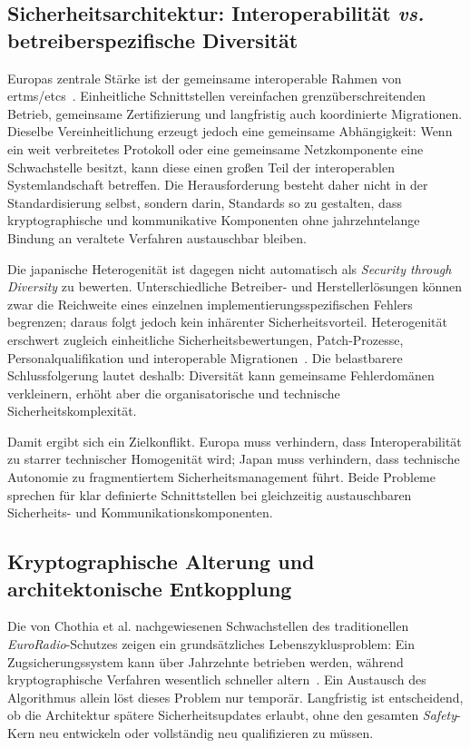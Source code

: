 \documentclass[runningheads]{res/llncs}
\begin{document}
\subsection{Sicherheitsarchitektur: Interoperabilität \textit{vs.} betreiberspezifische Diversität}
\label{sec:Sicherheitsarchitektur_Interoperabilität_vs_Betreiberspezifische_Diversität}
Europas zentrale Stärke ist der gemeinsame interoperable Rahmen von \gls{ertms}/\linebreak \gls{etcs}~\parencite[S. 49]{trinckaufETCS2024}. Einheitliche Schnittstellen vereinfachen grenzüberschreitenden Betrieb, gemeinsame Zertifizierung und langfristig auch koordinierte Migrationen. Dieselbe Vereinheitlichung erzeugt jedoch eine gemeinsame Abhängigkeit: Wenn ein weit verbreitetes Protokoll oder eine gemeinsame Netzkomponente eine Schwachstelle besitzt, kann diese einen großen Teil der interoperablen Systemlandschaft betreffen. Die Herausforderung besteht daher nicht in der Standardisierung selbst, sondern darin, Standards so zu gestalten, dass kryptographische und kommunikative Komponenten ohne jahrzehntelange Bindung an veraltete Verfahren austauschbar bleiben.

Die japanische Heterogenität ist dagegen nicht automatisch als \textit{Security through Diversity} zu bewerten. Unterschiedliche Betreiber- und Herstellerlösungen können zwar die Reichweite eines einzelnen implementierungsspezifischen Fehlers begrenzen; daraus folgt jedoch kein inhärenter Sicherheitsvorteil. Heterogenität erschwert zugleich einheitliche Sicherheitsbewertungen, Patch-Prozesse, Personalqualifikation und interoperable Migrationen~\parencite{yanaseJapanese2011}. Die belastbarere Schlussfolgerung lautet deshalb: Diversität kann gemeinsame Fehlerdomänen verkleinern, erhöht aber die organisatorische und technische Sicherheitskomplexität.

Damit ergibt sich ein Zielkonflikt. Europa muss verhindern, dass Interoperabilität zu starrer technischer Homogenität wird; Japan muss verhindern, dass technische Autonomie zu fragmentiertem Sicherheitsmanagement führt. Beide Probleme sprechen für klar definierte Schnittstellen bei gleichzeitig austauschbaren Sicherheits- und Kommunikationskomponenten.

\subsection{Kryptographische Alterung und architektonische Entkopplung}
\label{sec:Kryptographische_Schwachstellen_und_MILS-basierte_Architekturkapselung}
Die von Chothia et al. nachgewiesenen Schwachstellen des traditionellen \textit{EuroRadio}-Schutzes zeigen ein grundsätzliches Lebenszyklusproblem: Ein Zugsicherungssystem kann über Jahrzehnte betrieben werden, während kryptographische Verfahren wesentlich schneller altern~\parencite[S. 751--754]{chothiaAttack2017}. Ein Austausch des Algorithmus allein löst dieses Problem nur temporär. Langfristig ist entscheidend, ob die Architektur spätere Sicherheitsupdates erlaubt, ohne den gesamten \textit{Safety}-Kern neu entwickeln oder vollständig neu qualifizieren zu müssen.
\end{document}
